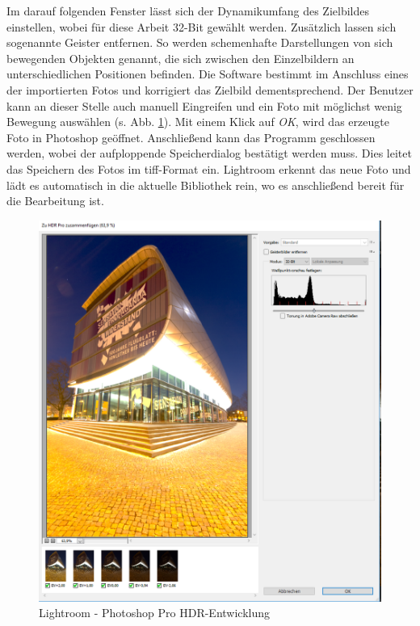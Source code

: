 \documentclass[liststotoc,bibtotoc,fontsize=14pt,]{scrreprt}
\begin{document}
		Im darauf folgenden Fenster lässt sich der Dynamikumfang des Zielbildes einstellen, wobei für diese Arbeit 32-Bit gewählt werden. Zusätzlich lassen sich sogenannte Geister entfernen. So werden schemenhafte Darstellungen von sich bewegenden Objekten genannt, die sich zwischen den Einzelbildern an unterschiedlichen Positionen befinden. Die Software bestimmt im Anschluss eines der importierten Fotos und korrigiert das Zielbild dementsprechend. Der Benutzer kann an dieser Stelle auch manuell Eingreifen und ein Foto mit möglichst wenig Bewegung auswählen (s. Abb. \ref{img:light_2}). Mit einem Klick auf \textit{OK}, wird das erzeugte Foto in Photoshop geöffnet. Anschließend kann das Programm geschlossen werden, wobei der aufploppende Speicherdialog bestätigt werden muss. Dies leitet das Speichern des Fotos im tiff-Format ein. Lightroom erkennt das neue Foto und lädt es automatisch in die aktuelle Bibliothek rein, wo es anschließend bereit für die Bearbeitung ist.
		
		\bigskip
		\begin{figure}[H]
			\includegraphics[width=.95\linewidth]{img/lightroom2.png}
			\caption{Lightroom - Photoshop Pro HDR-Entwicklung}
			\label{img:light_2}
		\end{figure}
		
\end{document}
